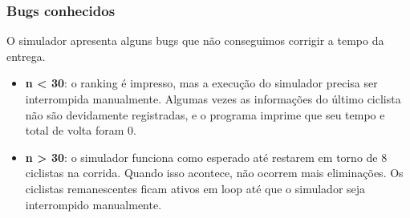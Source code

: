 \documentclass{beamer}
\begin{document}
\begin{frame}
\frametitle{Bugs conhecidos}
O simulador apresenta alguns bugs que não conseguimos corrigir a tempo da entrega. 

\begin{itemize}
\item \textbf{n < 30}: o ranking é impresso, mas a execução do simulador precisa ser interrompida manualmente. Algumas vezes as informações do último ciclista não são devidamente registradas, e o programa imprime que seu tempo e total de volta foram 0.

\item \textbf{n > 30}: o simulador funciona como esperado até restarem em torno de 8 ciclistas na corrida. Quando isso acontece, não ocorrem mais eliminações. Os ciclistas remanescentes ficam ativos em loop até que o simulador seja interrompido manualmente.

\end{itemize}

\end{frame}
\end{document}
